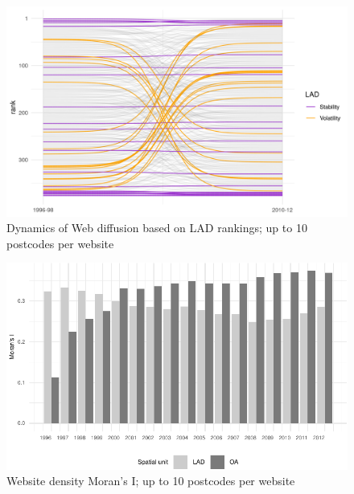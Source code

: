 \documentclass[
  authoryear,
  preprint,
  3p]{elsarticle}
\begin{document}
\begin{figure}[H]

{\centering \includegraphics[width=1\textwidth,height=\textheight]{../../outputs/ranks/web_per_firm2000_2012_only0595_av_10.png}

}

\caption{\label{rank10}Dynamics of Web diffusion based on LAD rankings;
up to 10 postcodes per website}

\end{figure}%

\begin{figure}[H]

{\centering \includegraphics[width=1\textwidth,height=\textheight]{anonymised_files/figure-pdf/morani10-1.pdf}

}

\caption{\label{morani10}Website density Moran's I; up to 10 postcodes
per website}

\end{figure}%
\end{document}
